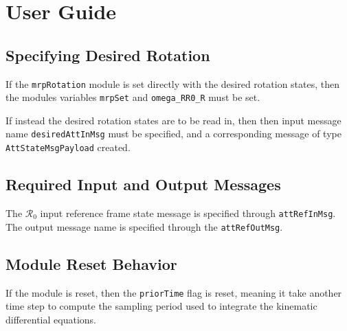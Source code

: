 
\section{User Guide}
\subsection{Specifying Desired Rotation}
If the {\tt mrpRotation} module is set directly with the desired rotation states, then the modules variables {\tt mrpSet} and {\tt omega\_RR0\_R} must be set.

If instead the desired rotation states are to be read in, then then input message name {\tt desiredAttInMsg} must be specified, and a corresponding message of type {\tt AttStateMsgPayload} created.  

\subsection{Required Input and Output Messages}
The $\mathcal{R}_{0}$ input reference frame state message is specified through {\tt attRefInMsg}.
The output message name is specified through the {\tt attRefOutMsg}. 

\subsection{Module Reset Behavior}
If the module is reset, then the {\tt priorTime} flag is reset, meaning it take another time step to compute the sampling period used to integrate the kinematic differential equations.  